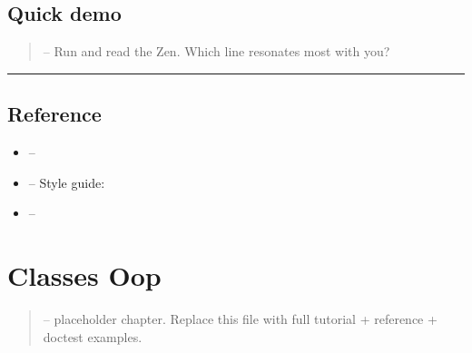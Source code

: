 \documentclass[a4paper,11pt,english]{sphinxmanual}
\begin{document}
\subsection{Quick demo}
\label{\detokenize{getting_started/why_python:quick-demo}}
\begin{sphinxVerbatim}[commandchars=\\\{\}]
\end{sphinxVerbatim}
\begin{quote}

\sphinxAtStartPar
{} – Run  and read the Zen. Which line resonates most with you?
\end{quote}


\bigskip\hrule\bigskip



\subsection{Reference}
\label{\detokenize{getting_started/why_python:reference}}\begin{itemize}
\item {} 
\sphinxAtStartPar
{} – 

\item {} 
\sphinxAtStartPar
{} – Style guide: 

\item {} 
\sphinxAtStartPar
{} – 

\end{itemize}

\sphinxstepscope


\section{Classes Oop}
\label{\detokenize{core_language/classes_oop:classes-oop}}\label{\detokenize{core_language/classes_oop::doc}}\begin{quote}

\sphinxAtStartPar
{} – placeholder chapter. Replace this file with full tutorial + reference + doctest examples.
\end{quote}
\end{document}
